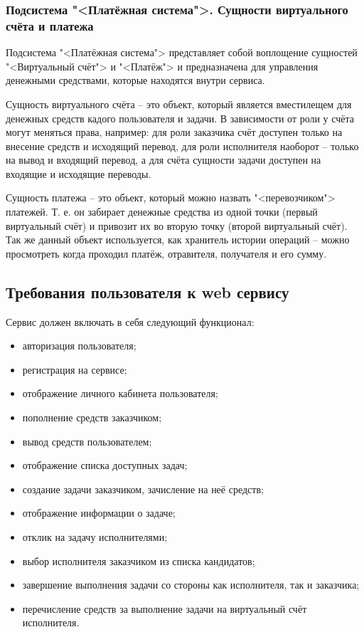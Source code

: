 \subsubsection{Подсистема "<Платёжная система">. Сущности виртуального счёта и платежа}

Подсистема "<Платёжная система"> представляет собой воплощение сущностей "<Виртуальный счёт"> и "<Платёж"> и предназначена для управления денежными средствами, которые находятся внутри сервиса. 

Сущность виртуального счёта -- это объект, который является вместилещем для денежных средств кадого пользователя и задачи. В зависимости от роли у счёта могут меняться права, например: для роли заказчика счёт доступен только на внесение средств и исходящий перевод, для роли исполнителя наоборот -- только на вывод и входящий перевод, а для счёта сущности задачи доступен на входящие и исходящие переводы.

Сущность платежа -- это объект, который можно назвать "<перевозчиком"> платежей. Т. е. он забирает денежные средства из одной точки (первый виртуальный счёт) и привозит их во вторую точку (второй виртуальный счёт). Так же данный объект используется, как хранитель истории операций -- можно просмотреть когда проходил платёж, отравителя, получателя и его сумму.

\subsection{Требования пользователя к web сервису}

Сервис должен включать в себя следующий функционал:
\begin{itemize}
    \item авторизация пользователя;
    \item регистрация на сервисе;
    \item отображение личного кабинета пользователя;
    \item пополнение средств заказчиком;
    \item вывод средств пользователем;
    \item отображение списка доступных задач;
    \item создание задачи заказчиком, зачисление на неё средств;
    \item отображение информации о задаче;
    \item отклик на задачу исполнителями;
    \item выбор исполнителя заказчиком из списка кандидатов;
    \item завершение выполнения задачи со стороны как исполнителя, так и заказчика;
    \item перечисление средств за выполнение задачи на виртуальный счёт исполнителя.
\end{itemize}


